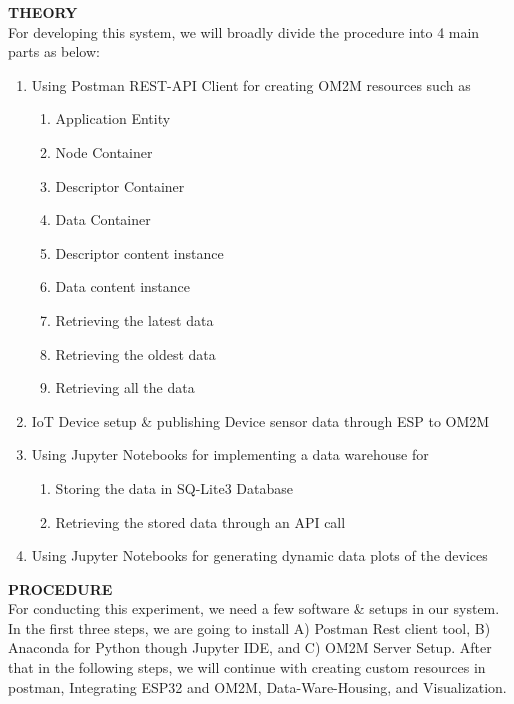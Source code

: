 \documentclass[12pt,a4paper]{article}
\begin{document}
\begin{justify}
\textbf{\large THEORY}\\[3pt]
For developing this system, we will broadly divide the procedure into 4 main parts as below:
\vspace{-3mm}
\begin{enumerate}
    \item  Using Postman REST-API Client for creating OM2M resources such as 
      \begin{enumerate}
        \item Application Entity
        \item Node Container
        \item Descriptor Container
        \item Data Container
        \item Descriptor content instance
        \item Data content instance
        \item Retrieving the latest data
        \item Retrieving the oldest data
        \item Retrieving all the data
      \end{enumerate}
\item IoT Device setup \& publishing Device sensor data through ESP to OM2M
\item Using Jupyter Notebooks for implementing a data warehouse for 
    \begin{enumerate}
        \item Storing the data in SQ-Lite3 Database
        \item Retrieving the stored data through an API call
    \end{enumerate}
\item Using Jupyter Notebooks for generating dynamic data plots of the devices
\end{enumerate}




\noindent \textbf{\large PROCEDURE}\\[6pt]
For conducting this experiment, we need a few software \& setups in our system. In the first three steps, we are going to install A) Postman Rest client tool,  B) Anaconda for Python though Jupyter IDE, and C) OM2M Server Setup. After that in the following steps, we will continue with creating custom resources in postman, Integrating ESP32 and OM2M, Data-Ware-Housing, and Visualization. 


\end{justify}
\end{document}
